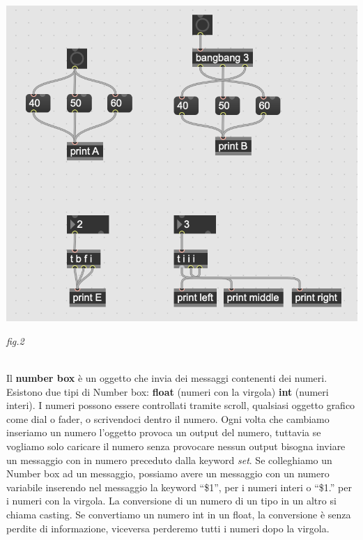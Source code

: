 \documentclass[11pt]{article}
\begin{document}
\begin{multicols*}{2}
\begin{center}
\includegraphics[scale=0.3]{images/02_bang.png}

{\scriptsize \emph{fig.2 }}
\end{center}

\textbf{}\\

\noindent Il \textbf{number box} è un oggetto che invia dei messaggi contenenti dei numeri. Esistono due tipi di Number box: \textbf{float} (numeri con la virgola) \textbf{int} (numeri interi). I numeri possono essere controllati tramite scroll, qualsiasi oggetto grafico come dial o fader, o scrivendoci dentro il numero. Ogni volta che cambiamo inseriamo un numero l’oggetto provoca un output del numero, tuttavia se vogliamo solo caricare il numero senza provocare nessun output bisogna inviare un messaggio con in numero preceduto dalla keyword \textit{set}.
Se colleghiamo un Number box ad un messaggio, possiamo avere un messaggio con un numero variabile inserendo nel messaggio la keyword “\$1”, per i numeri interi o “\$1.” per i numeri con la virgola.
La conversione di un numero di un tipo in un altro si chiama casting. Se convertiamo un numero int in un float, la conversione è senza perdite di informazione, viceversa perderemo tutti i numeri dopo la virgola.


\end{multicols*}
\end{document}
